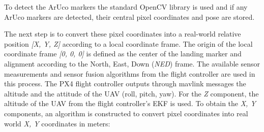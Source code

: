 \documentclass[conference, onecolumn, draftclsnofoot]{IEEEtran}
\begin{document}
%
To detect the ArUco markers the standard OpenCV library is used and if
any ArUco markers are detected, their central pixel coordinates and
pose are stored.

The next step is to convert these pixel coordinates into a real-world
relative position \emph{[X, Y, Z]} according to a local coordinate frame. The
origin of the local coordinate frame \emph{[0, 0, 0]} is defined as the
center of the landing marker and alignment according to the North,
East, Down (\emph{NED}) frame.
%
%
The available sensor measurements and sensor fusion algorithms from
the flight controller are used in this process. The PX4 flight
controller outputs through mavlink messages the altitude and the attitude of the UAV (roll, pitch, yaw). For the \emph{Z} component,
the altitude of the UAV from the flight controller's EKF is used. To
obtain the \emph{X, Y} components, an algorithm is constructed to convert
pixel coordinates into real world \emph{X, Y} coordinates in meters:
%
%




\end{document}

